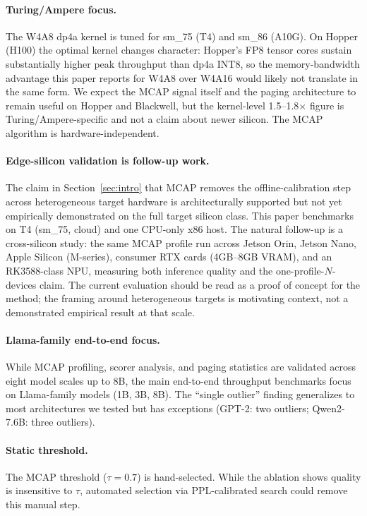 \documentclass{article}
\begin{document}
\paragraph{Turing/Ampere focus.} The W4A8 dp4a kernel is tuned for sm\_75 (T4) and
sm\_86 (A10G). On Hopper (H100) the optimal kernel changes character: Hopper's FP8
tensor cores sustain substantially higher peak throughput than dp4a INT8, so the
memory-bandwidth advantage this paper reports for W4A8 over W4A16 would likely not
translate in the same form. We expect the MCAP signal itself and the paging
architecture to remain useful on Hopper and Blackwell, but the kernel-level
1.5--1.8$\times$ figure is Turing/Ampere-specific and not a claim about newer silicon.
The MCAP algorithm is hardware-independent.

\paragraph{Edge-silicon validation is follow-up work.} The claim in
Section~\ref{sec:intro} that MCAP removes the offline-calibration step across
heterogeneous target hardware is architecturally supported but not yet
empirically demonstrated on the full target silicon class. This paper
benchmarks on T4 (sm\_75, cloud) and one CPU-only x86 host. The natural
follow-up is a cross-silicon study: the same MCAP profile run across Jetson
Orin, Jetson Nano, Apple Silicon (M-series), consumer RTX cards (4GB--8GB
VRAM), and an RK3588-class NPU, measuring both inference quality and the
one-profile-$N$-devices claim. The current evaluation should be read as a
proof of concept for the method; the framing around heterogeneous targets is
motivating context, not a demonstrated empirical result at that scale.

\paragraph{Llama-family end-to-end focus.} While MCAP profiling, scorer analysis, and
paging statistics are validated across eight model scales up to 8B, the main end-to-end
throughput benchmarks focus on Llama-family models (1B, 3B, 8B). The ``single outlier''
finding generalizes to most architectures we tested but has exceptions (GPT-2: two
outliers; Qwen2-7.6B: three outliers).

\paragraph{Static threshold.} The MCAP threshold ($\tau = 0.7$) is hand-selected. While the
ablation shows quality is insensitive to $\tau$, automated selection via PPL-calibrated
search could remove this manual step.
\end{document}
